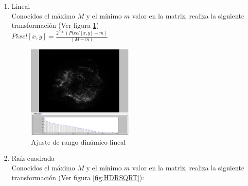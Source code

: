 	\begin{enumerate}
		\item Lineal\\
		Conocidos el máximo $M$ y el mínimo $m$ valor en la matriz, realiza
		la siguiente transformación (Ver figura \ref{fig:HDRLineal})\\
		
			$Pixel[x,y]=\frac{2^{r}*(Pixel[x,y]-m)}{(M-m)}$
			\begin{figure}[!htb]
				\centering
				\includegraphics[width=0.5\textwidth]{images/HDREQ/chandraLineal.PNG}
				\caption{\label{fig:HDRLineal}Ajuste de rango dinámico lineal}
			\end{figure}
		\item Raíz cuadrada\\
		Conocidos el máximo $M$ y el mínimo $m$ valor en la matriz, realiza
		la siguiente transformación (Ver figura \ref{fig:HDRSQRT}):
		

\end{enumerate}
